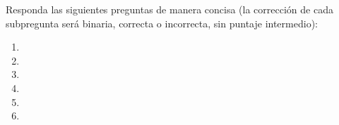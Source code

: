 
\noindent Responda las siguientes preguntas de manera concisa (la corrección de cada subpregunta será binaria,
correcta o incorrecta, sin puntaje intermedio):
\begin{enumerate}[label=(\alph*)]
\item 
\item 
\item 
\item 
\item 
\item 
\end{enumerate}